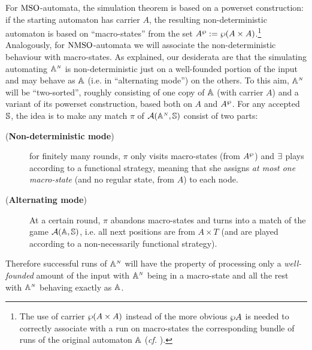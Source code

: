 For $\mathrm{MSO}$-automata, the simulation theorem is based on a powerset construction: if the starting automaton has carrier $A$, the resulting non-deterministic automaton is based on ``macro-states'' from the set $A^{\wp} := \wp (A \times A)$.\footnote{The use of carrier $\wp (A \times A)$ instead of the more obvious $\wp A$ is needed to correctly associate with a run on macro-states the corresponding bundle of runs of the original automaton $\mathbb{A}$ (\emph{cf.} \cite{Walukiewicz96}).} Analogously, for $\mathrm{NMSO}$-automata we will associate the non-deterministic behaviour with macro-states. As explained, our desiderata are that the simulating automating $\mathbb{A}^{{\scriptscriptstyle N}}$ is non-deterministic just on a well-founded portion of the input and may behave as $\mathbb{A}$ (i.e. in ``alternating mode'') on the others. To this aim, $\mathbb{A}^{{\scriptscriptstyle N}}$ will be ``two-sorted'', roughly consisting of one copy of $\mathbb{A}$ (with carrier $A$) and a variant of its powerset construction, based both on $A$ and $A^{\wp}$. For any accepted $\mathbb{S}$, the idea is to make any match $\pi$ of $\mathcal{A}(\mathbb{A}^{{\scriptscriptstyle N}},\mathbb{S})$ consist of two parts:
\begin{description}
  \item[(\textbf{Non-deterministic mode})] for finitely many rounds, $\pi$ only visits macro-states (from $A^{\wp}$) and $\exists$ plays according to a functional strategy, meaning that she assigns \emph{at most one macro-state} (and no regular state, from $A$) to each node.%
  \item[(\textbf{Alternating mode})] At a certain round, $\pi$ abandons macro-states and turns into a match of the game $\mathcal{A}(\mathbb{A},\mathbb{S})$, i.e. all next positions are from $A \times T$ (and are played according to a non-necessarily functional strategy). %
\end{description}
Therefore successful runs of $\mathbb{A}^{{\scriptscriptstyle N}}$ will have the property of processing only a \emph{well-founded} amount of the input with $\mathbb{A}^{{\scriptscriptstyle N}}$ being in a macro-state and all the rest with $\mathbb{A}^{{\scriptscriptstyle N}}$ behaving exactly as $\mathbb{A}$.

